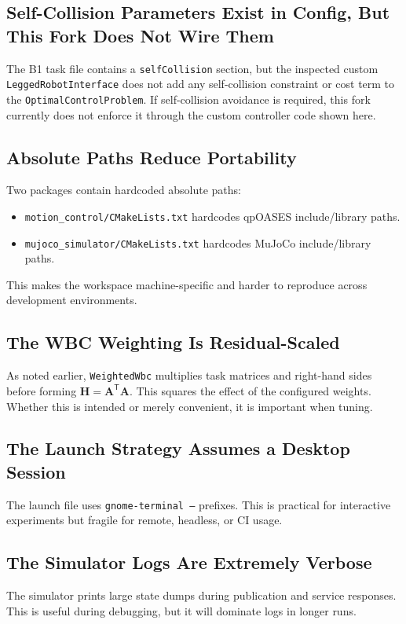 \documentclass[11pt,a4paper]{article}
\newcommand{\mat}[1]{\bm{#1}}
\newcommand{\trans}{^{\mathsf T}}
\newcommand{\code}[1]{\texttt{#1}}
\begin{document}
\subsection{Self-Collision Parameters Exist in Config, But This Fork Does Not Wire Them}
The B1 task file contains a \code{selfCollision} section, but the inspected custom \code{LeggedRobotInterface} does not add any self-collision constraint or cost term to the \code{OptimalControlProblem}. If self-collision avoidance is required, this fork currently does not enforce it through the custom controller code shown here.

\subsection{Absolute Paths Reduce Portability}
Two packages contain hardcoded absolute paths:
\begin{itemize}[leftmargin=*]
\item \code{motion\_control/CMakeLists.txt} hardcodes qpOASES include/library paths.
\item \code{mujoco\_simulator/CMakeLists.txt} hardcodes MuJoCo include/library paths.
\end{itemize}
This makes the workspace machine-specific and harder to reproduce across development environments.

\subsection{The WBC Weighting Is Residual-Scaled}
As noted earlier, \code{WeightedWbc} multiplies task matrices and right-hand sides before forming \(\mat{H}=\mat{A}\trans\mat{A}\). This squares the effect of the configured weights. Whether this is intended or merely convenient, it is important when tuning.

\subsection{The Launch Strategy Assumes a Desktop Session}
The launch file uses \code{gnome-terminal --} prefixes. This is practical for interactive experiments but fragile for remote, headless, or CI usage.

\subsection{The Simulator Logs Are Extremely Verbose}
The simulator prints large state dumps during publication and service responses. This is useful during debugging, but it will dominate logs in longer runs.
\end{document}
